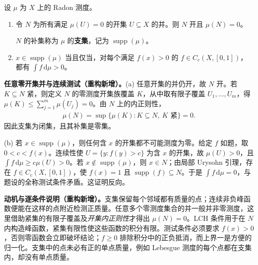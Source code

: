 \documentclass[../../main.tex]{subfiles}
\begin{document}
\begin{exercise}\label{exercise:ch07-measure-support}
设 $\mu$ 为 $X$ 上的 Radon 测度。
\begin{enumerate}[label=\alph*.,ref=(\alph*)]
\item\label{item:ch07-support-null-open-union} 令 $N$ 为所有满足 $\mu(U)=0$ 的开集 $U\subseteq X$ 的并。则 $N$ 开且 $\mu(N)=0$。
\begin{definition*}[测度的支集]\label{definition:ch07-measure-support}
$N$ 的补集称为 $\mu$ 的\textbf{支集}，记为 $\operatorname{supp}(\mu)$。
\end{definition*}
\item\label{item:ch07-support-test-functions} $x\in\operatorname{supp}(\mu)$ 当且仅当，对每个满足 $f(x)>0$ 的 $f\in C_c(X,[0,1])$，都有 $\int f\,\mathrm d\mu>0$。
\end{enumerate}
\end{exercise}
\begin{solution}
\textbf{任意零开集并与连续测试（重构新增）。}(a) 任意开集的并仍开，故 $N$ 开。若 $K\subseteq N$ 紧，则定义 $N$ 的零测度开集族覆盖 $K$，从中取有限子覆盖 $U_1,\ldots,U_m$，得 $\mu(K)\leqslant\sum_{j=1}^m\mu(U_j)=0$。由 $N$ 上的内正则性，
\begin{align*}
\mu(N)=\sup\{\mu(K):K\subseteq N,\ K\text{ 紧}\}=0.
\end{align*}
因此支集为闭集，且其补集是零集。

(b) 若 $x\in\operatorname{supp}(\mu)$，则任何含 $x$ 的开集都不可能测度为零。给定 $f$ 如题，取 $0<c<f(x)$。连续性使 $U=\{y:f(y)>c\}$ 为含 $x$ 的开集，故 $\mu(U)>0$，且 $\int f\,\mathrm d\mu\geqslant c\mu(U)>0$。若 $x\notin\operatorname{supp}(\mu)$，则 $x\in N$；由局部 Urysohn 引理，存在 $f\in C_c(X,[0,1])$，使 $f(x)=1$ 且 $\operatorname{supp}(f)\subseteq N$。于是 $\int f\,\mathrm d\mu=0$，与题设的全称测试条件矛盾。这证明反向。
\end{solution}
\begin{remark}
\textbf{动机与逐条件说明（重构新增）。}支集保留每个邻域都有质量的点；连续非负峰函数便能在这样的点附近检测正质量。任意多个零测度集合的并一般并非零测度，这里借助紧集的有限子覆盖及\emph{开集内正则性}才得出 $\mu(N)=0$。LCH 条件用于在 $N$ 内构造峰函数，紧集有限性使这些函数的积分有限。测试条件必须要求 $f(x)>0$，否则零函数会立即破坏结论；$f\geqslant0$ 排除积分中的正负抵消，而上界一是方便的归一化。支集中的点未必有正的单点质量，例如 Lebesgue 测度的每个点都在支集内，却没有单点质量。
\end{remark}
\end{document}
